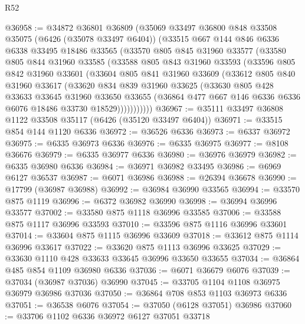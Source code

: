 \begin{lexlean}{R52}
\begin{coremodule}
@36958 := @34872
    @36801
    @36809
    (@35069
      @33497
      @36800
      @848
      @33508
      @35075
      (@6426 (@35078 @33497 @6404))
      (@33515
        @667
        @144
        @846
        @6336
        @6338
        @33495
        @18486
        @33565
        (@33570
          @805
          @845
          @31960
          @33577
          (@33580
            @805
            @844
            @31960
            @33585
            (@33588
              @805
              @843
              @31960
              @33593
              (@33596
                @805
                @842
                @31960
                @33601
                (@33604
                  @805
                  @841
                  @31960
                  @33609
                  (@33612
                    @805
                    @840
                    @31960
                    @33617
                    (@33620
                      @834
                      @839
                      @31960
                      @33625
                      (@33630
                        @805
                        @428
                        @33633
                        @33645
                        @31960
                        @33650
                        @33655
                        (@36864 @477 @667 @146 @6336 @6336 @6076 @18486 @33730 @18529)))))))))))
@36967 := @35111 @33497 @36808 @1122 @33508 @35117 (@6426 (@35120 @33497 @6404))
@36971 := @33515 @854 @144 @1120 @6336
@36972 := @36526 @6336
@36973 := @6337 @36972
@36975 := @6335 @36973 @6336
@36976 := @6335 @36975
@36977 := @8108 @36676
@36979 := @6335 @36977 @6336
@36980 := @36976 @36979
@36982 := @6335 @36980 @6336
@36984 := @36971 @36982 @33495
@36986 := @6969 @6127 @36537
@36987 := @6071 @36986
@36988 := @26394 @36678
@36990 := @17799 (@36987 @36988)
@36992 := @36984 @36990 @33565
@36994 := @33570 @875 @1119
@36996 := @6372 @36982 @36990
@36998 := @36994 @36996 @33577
@37002 := @33580 @875 @1118 @36996 @33585
@37006 := @33588 @875 @1117 @36996 @33593
@37010 := @33596 @875 @1116 @36996 @33601
@37014 := @33604 @875 @1115 @36996 @33609
@37018 := @33612 @875 @1114 @36996 @33617
@37022 := @33620 @875 @1113 @36996 @33625
@37029 := @33630 @1110 @428 @33633 @33645 @36996 @33650 @33655
@37034 := @36864 @485 @854 @1109 @36980 @6336
@37036 := @6071 @36679 @6076
@37039 := @37034 (@36987 @37036) @36990
@37045 := @33705 @1104 @1108 @36975 @36979 @36986 @37036
@37050 := @36864 @708 @853 @1103 @36973 @6336
@37051 := @36538 @6076
@37054 := @37050 (@6128 @37051) @36986
@37060 := @33706 @1102 @6336 @36972 @6127 @37051 @33718

\end{coremodule}
\end{lexlean}
